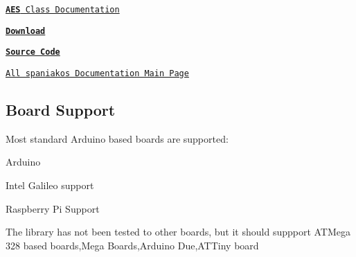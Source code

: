 \begin{DoxyItemize}
\item \href{http://spaniakos.github.io/AES/classAES.html}{\tt {\bfseries A\+ES} Class Documentation} \item \href{https://github.com/spaniakos/AES/archive/master.zip}{\tt {\bfseries Download}} \item \href{https://github.com/spaniakos/AES/}{\tt {\bfseries Source Code}} \item \href{http://spaniakos.github.io/}{\tt All spaniakos Documentation Main Page}\end{DoxyItemize}
\hypertarget{group__aeslib_AesBoard_Support}{}\subsection{Board Support}\label{group__aeslib_AesBoard_Support}
Most standard Arduino based boards are supported\+:
\begin{DoxyItemize}
\item Arduino
\item Intel Galileo support
\item Raspberry Pi Support
\item The library has not been tested to other boards, but it should suppport A\+T\+Mega 328 based boards,Mega Boards,Arduino Due,A\+T\+Tiny board 
\end{DoxyItemize}